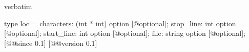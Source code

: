 \begin{camlexample}{verbatim}
\begin{caml}
\begin{camlinput}
type loc = {
  characters: (int * int) option [@optional];
  stop_line: int option [@optional];
  start_line: int option [@optional];
  file: string option [@optional];
} [@@since 0.1]
[@@version 0.1]
\end{camlinput}
\end{caml}
\end{camlexample}
